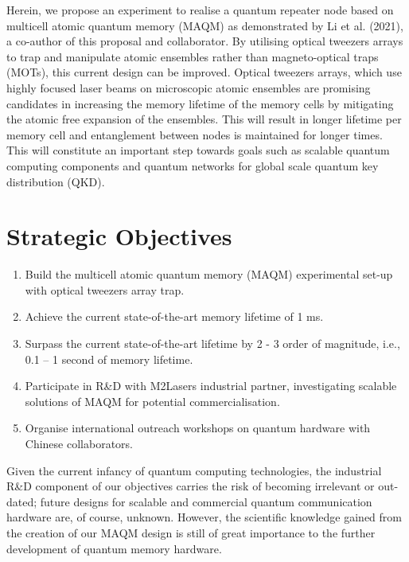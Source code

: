 \documentclass{epsrc}
\begin{document}
Herein, we propose an experiment to realise a quantum repeater node based on multicell atomic quantum memory (MAQM) as demonstrated by Li et al. (2021), a co-author of this proposal and collaborator. By utilising optical tweezers arrays to trap and manipulate atomic ensembles rather than magneto-optical traps (MOTs), this current design can be improved. Optical tweezers arrays, which use highly focused laser beams on microscopic atomic ensembles are promising candidates in increasing the memory lifetime of the memory cells by mitigating the atomic free expansion of the ensembles. This will result in longer lifetime per memory cell and entanglement between nodes is maintained for longer times. This will constitute an important step towards goals such as scalable quantum computing components and quantum networks for global scale quantum key distribution (QKD).

\vspace{16pt}

\section{Strategic Objectives}

\vspace{4pt}

\begin{enumerate}
  \item Build the multicell atomic quantum memory (MAQM) experimental set-up with optical tweezers array trap.
  \item Achieve the current state-of-the-art memory lifetime of 1 ms.
  \item Surpass the current state-of-the-art lifetime by 2 - 3 order of magnitude, i.e., 0.1 – 1 second of memory lifetime.
  \item Participate in R\&D with M2Lasers industrial partner, investigating scalable solutions of MAQM for potential commercialisation.
  \item Organise international outreach workshops on quantum hardware with Chinese collaborators.
\end{enumerate}

\vspace{8pt}

Given the current infancy of quantum computing technologies, the industrial R\&D component of our objectives carries the risk of becoming irrelevant or out-dated; future designs for scalable and commercial quantum communication hardware are, of course, unknown. However, the scientific knowledge gained from the creation of our MAQM design is still of great importance to the further development of quantum memory hardware.
\end{document}
